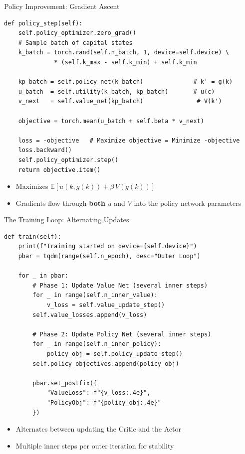 \documentclass[10pt,english,aspectratio=169]{beamer}
\begin{document}
\begin{frame}[fragile]{Policy Improvement: Gradient Ascent}
\vspace{-0.3cm}
\begin{lstlisting}[style=pythonstyle,basicstyle=\ttfamily\tiny]
def policy_step(self):
    self.policy_optimizer.zero_grad()
    # Sample batch of capital states
    k_batch = torch.rand(self.n_batch, 1, device=self.device) \
              * (self.k_max - self.k_min) + self.k_min

    kp_batch = self.policy_net(k_batch)              # k' = g(k)
    u_batch  = self.utility(k_batch, kp_batch)       # u(c)
    v_next   = self.value_net(kp_batch)               # V(k')

    objective = torch.mean(u_batch + self.beta * v_next)

    loss = -objective   # Maximize objective = Minimize -objective
    loss.backward()
    self.policy_optimizer.step()
    return objective.item()
\end{lstlisting}
\vspace{-0.3cm}
\begin{itemize}
  \item Maximizes $\mathbb{E}[u(k, g(k)) + \beta\, V(g(k))]$
  \item Gradients flow through \textbf{both} $u$ and $V$ into the policy network parameters
\end{itemize}
\end{frame}

\begin{frame}[fragile]{The Training Loop: Alternating Updates}
\vspace{-0.3cm}
\begin{lstlisting}[style=pythonstyle,basicstyle=\ttfamily\tiny]
def train(self):
    print(f"Training started on device={self.device}")
    pbar = tqdm(range(self.n_epoch), desc="Outer Loop")

    for _ in pbar:
        # Phase 1: Update Value Net (several inner steps)
        for _ in range(self.n_inner_value):
            v_loss = self.value_update_step()
        self.value_losses.append(v_loss)

        # Phase 2: Update Policy Net (several inner steps)
        for _ in range(self.n_inner_policy):
            policy_obj = self.policy_update_step()
        self.policy_objectives.append(policy_obj)

        pbar.set_postfix({
            "ValueLoss": f"{v_loss:.4e}",
            "PolicyObj": f"{policy_obj:.4e}"
        })
\end{lstlisting}
\vspace{-0.3cm}
\begin{itemize}
  \item Alternates between updating the Critic and the Actor
  \item Multiple inner steps per outer iteration for stability
\end{itemize}
\end{frame}
\end{document}
